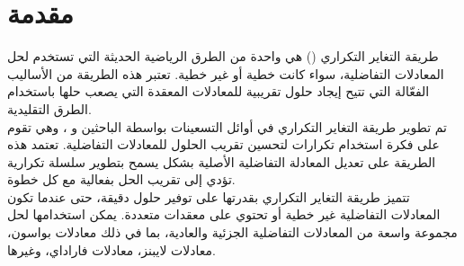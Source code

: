 \chapter*{مقدمة}


طريقة التغاير التكراري
() هي واحدة من الطرق الرياضية الحديثة التي تستخدم لحل المعادلات التفاضلية، سواء كانت خطية أو غير خطية. تعتبر هذه الطريقة من الأساليب الفعّالة التي تتيح إيجاد حلول تقريبية للمعادلات المعقدة التي يصعب حلها باستخدام الطرق التقليدية.\\
\noindent
تم تطوير طريقة التغاير التكراري في أوائل التسعينات بواسطة الباحثين و ، وهي تقوم على فكرة استخدام تكرارات لتحسين تقريب الحلول للمعادلات التفاضلية. تعتمد هذه الطريقة على تعديل المعادلة التفاضلية الأصلية بشكل يسمح بتطوير سلسلة تكرارية تؤدي إلى تقريب الحل بفعالية مع كل خطوة.\\
\noindent
تتميز طريقة التغاير التكراري بقدرتها على توفير حلول دقيقة، حتى عندما تكون المعادلات التفاضلية غير خطية أو تحتوي على معقدات متعددة. يمكن استخدامها لحل مجموعة واسعة من المعادلات التفاضلية الجزئية والعادية، بما في ذلك معادلات بواسون، معادلات لايبنز، معادلات فاراداي، وغيرها.